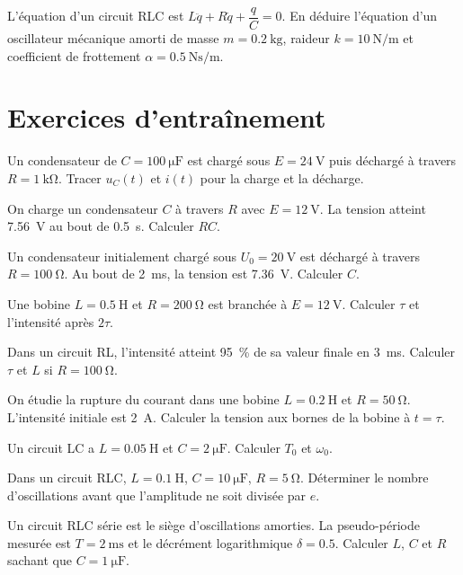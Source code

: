 \exo{} L’équation d’un circuit RLC est $L\ddot{q} + R\dot{q} + \dfrac{q}{C} = 0$. En déduire l’équation d’un oscillateur mécanique amorti de masse $m = \SI{0.2}{\kilogram}$, raideur $k = \SI{10}{\newton\per\metre}$ et coefficient de frottement $\alpha = \SI{0.5}{\newton\second\per\metre}$.

\section{Exercices d’entraînement}


\exo{} Un condensateur de $C = \SI{100}{\micro\farad}$ est chargé sous $E = \SI{24}{\volt}$ puis déchargé à travers $R = \SI{1}{\kilo\ohm}$. Tracer $u_C(t)$ et $i(t)$ pour la charge et la décharge.

\exo{} On charge un condensateur $C$ à travers $R$ avec $E = \SI{12}{\volt}$. La tension atteint \SI{7.56}{\volt} au bout de \SI{0.5}{\second}. Calculer $RC$.

\exo{} Un condensateur initialement chargé sous $U_0 = \SI{20}{\volt}$ est déchargé à travers $R = \SI{100}{\ohm}$. Au bout de \SI{2}{\milli\second}, la tension est \SI{7.36}{\volt}. Calculer $C$.


\exo{} Une bobine $L = \SI{0.5}{\henry}$ et $R = \SI{200}{\ohm}$ est branchée à $E = \SI{12}{\volt}$. Calculer $\tau$ et l’intensité après $2\tau$.

\exo{} Dans un circuit RL, l’intensité atteint \SI{95}{\%} de sa valeur finale en \SI{3}{\milli\second}. Calculer $\tau$ et $L$ si $R = \SI{100}{\ohm}$.

\exo{} On étudie la rupture du courant dans une bobine $L = \SI{0.2}{\henry}$ et $R = \SI{50}{\ohm}$. L’intensité initiale est \SI{2}{\ampere}. Calculer la tension aux bornes de la bobine à $t = \tau$.


\exo{} Un circuit LC a $L = \SI{0.05}{\henry}$ et $C = \SI{2}{\micro\farad}$. Calculer $T_0$ et $\omega_0$.

\exo{} Dans un circuit RLC, $L = \SI{0.1}{\henry}$, $C = \SI{10}{\micro\farad}$, $R = \SI{5}{\ohm}$. Déterminer le nombre d’oscillations avant que l’amplitude ne soit divisée par $e$.

\exo{} Un circuit RLC série est le siège d’oscillations amorties. La pseudo-période mesurée est $T = \SI{2}{\milli\second}$ et le décrément logarithmique $\delta = 0.5$. Calculer $L$, $C$ et $R$ sachant que $C = \SI{1}{\micro\farad}$.

